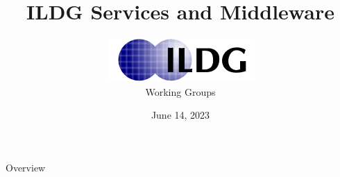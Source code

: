\documentclass[aspectratio=169,xcolor=dvipsnames]{beamer}
\title[short title]{ILDG Services and Middleware}
\author{\includegraphics[scale=0.5]{ildg-logo}\\Working Groups}
\institute{Hands-on Workshop}
\date{June 14, 2023 } %
\begin{document}
\begin{frame}
    \titlepage

\end{frame}

\begin{frame}{Overview}
    \tableofcontents
\end{frame}


\end{document}

